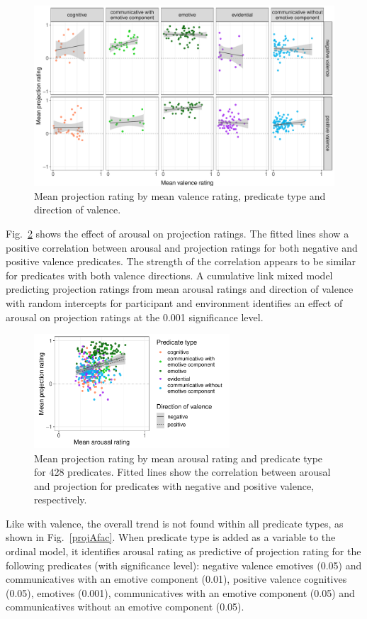 \documentclass[11pt,fleqn]{article}
\newcommand{\figref}[1]{Fig.~\ref{#1}}
\newcommand{\6}{\mbox{$[\hspace*{-.6mm}[$}}
\newcommand{\9}{\mbox{$]\hspace*{-.6mm}]$}}
\begin{document}
\begin{figure}[H]
	\centering
	\includegraphics[width=.8\textwidth]{projection-by-valence-and-direction-of-valence-faceted2}
	\caption{Mean projection rating by mean valence rating, predicate type and direction of valence.}
	\label{projVfac}
\end{figure}

\figref{projAdir} shows the effect of arousal on projection ratings. The fitted lines show a positive correlation between arousal and projection ratings for both negative and positive valence predicates. The strength of the correlation appears to be similar for predicates with both valence directions. A cumulative link mixed model predicting projection ratings from mean arousal ratings and direction of valence with random intercepts for participant and environment identifies an effect of arousal on projection ratings at the 0.001 significance level.

\begin{figure}[H]
	\centering
	\includegraphics[width=0.65\textwidth]{projection-by-arousal-with-direction}
	\caption{Mean projection rating by mean arousal rating and predicate type for 428 predicates. Fitted lines show the correlation between arousal and projection for predicates with negative and positive valence, respectively.}
	\label{projAdir}
\end{figure}

Like with valence, the overall trend is not found within all predicate types, as shown in \figref{projAfac}. When predicate type is added as a variable to the ordinal model, it identifies arousal rating as predictive of projection rating for the following predicates (with significance level): negative valence emotives (0.05) and communicatives with an emotive component (0.01), positive valence cognitives (0.05), emotives (0.001), communicatives with an emotive component (0.05) and communicatives without an emotive component (0.05).
\end{document}
